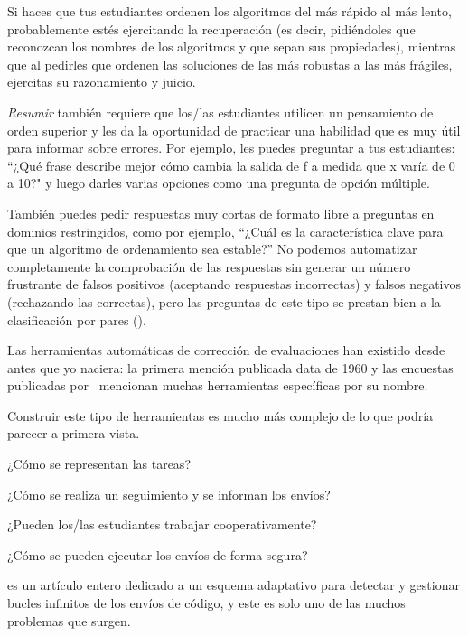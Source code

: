 Si haces que tus estudiantes ordenen los algoritmos del más rápido al más lento, probablemente estés ejercitando la recuperación
(es decir, pidiéndoles que reconozcan los nombres de los algoritmos y que sepan sus propiedades), mientras que al pedirles que ordenen las soluciones de las más robustas a las más frágiles, ejercitas su razonamiento y juicio.

\emph{Resumir} también requiere que los/las estudiantes utilicen un pensamiento de orden superior y les da la oportunidad de practicar una habilidad que es muy útil para informar sobre errores.
Por ejemplo, 
les puedes preguntar a tus estudiantes:
 ``¿Qué frase describe mejor cómo cambia la salida de f a medida que  x varía de 0 a 10?" 
y luego darles varias opciones como una pregunta de opción múltiple.

También puedes pedir respuestas muy cortas de formato libre a preguntas en dominios restringidos, como por ejemplo, ``¿Cuál es la característica clave para que un algoritmo de ordenamiento sea estable?”
No podemos automatizar completamente la comprobación de las respuestas sin generar un número frustrante de falsos positivos 
(aceptando respuestas incorrectas) 
y falsos negativos (rechazando las correctas), 
pero las preguntas de este tipo se prestan bien a la clasificación por pares 
().


Las herramientas automáticas de corrección de evaluaciones han existido desde antes que yo naciera: la primera mención publicada data de 1960 y las encuestas publicadas por~\cite{Douc2005,Ihan2010} mencionan muchas herramientas específicas por su nombre.

Construir este tipo de herramientas es mucho más complejo de lo que podría parecer a primera vista.

¿Cómo se representan las tareas?

¿Cómo se realiza un seguimiento y se informan los envíos?

¿Pueden los/las estudiantes trabajar cooperativamente?

¿Cómo se pueden ejecutar los envíos de forma segura?

\cite{Edwa2014a} es un artículo entero dedicado a un esquema adaptativo para detectar y gestionar bucles infinitos de los envíos de código, y este es solo uno de las muchos problemas que surgen.

